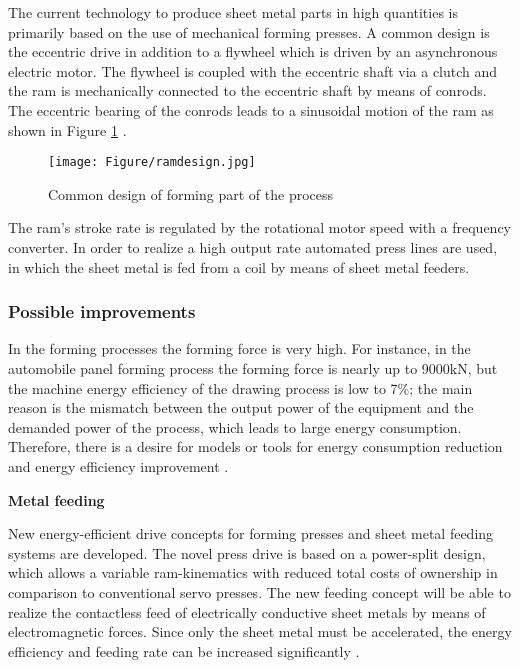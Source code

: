 The current technology to produce sheet metal parts in high quantities is primarily based on the use of mechanical forming presses. A common design is the eccentric drive in addition to a flywheel which is driven by an asynchronous electric motor. The flywheel is coupled with the eccentric shaft via a clutch and the ram is mechanically connected to the eccentric shaft by means of conrods. The eccentric bearing of the conrods leads to a sinusoidal motion of the ram as shown in Figure \ref{fig:formingdesign} \cite{Behrens2016}.

\begin{figure}[H]
	\centering
	\texttt{[image: Figure/ramdesign.jpg]}
	\caption{Common design of forming part of the process}
	\label{fig:formingdesign}
\end{figure}

The ram's stroke rate is regulated by the rotational motor speed with a frequency converter. In order to realize a high output rate automated press lines are used, in which the sheet metal is fed from a coil by means of sheet metal feeders.

\subsubsection{Possible improvements}

In the forming processes the forming force is very high. For instance, in the automobile panel forming process the forming force is nearly up to 9000kN, but the machine energy efficiency of the drawing process is low to 7\%; the main reason is the mismatch between the output power of the equipment and the demanded power of the process, which leads to large energy consumption. Therefore, there is a desire for models or tools for energy consumption reduction and energy efficiency improvement \cite{Gao2018}.

\textbf{Metal feeding}

New energy-efficient drive concepts for forming presses and sheet metal feeding systems are developed. The novel press drive is based on a power-split design, which allows a variable ram-kinematics with reduced total costs of ownership in comparison to conventional servo presses. The new feeding concept will be able to realize the contactless feed of electrically conductive sheet metals by means of electromagnetic forces. Since only the sheet metal must be accelerated, the energy efficiency and feeding rate can be increased significantly \cite{Behrens2016}.

